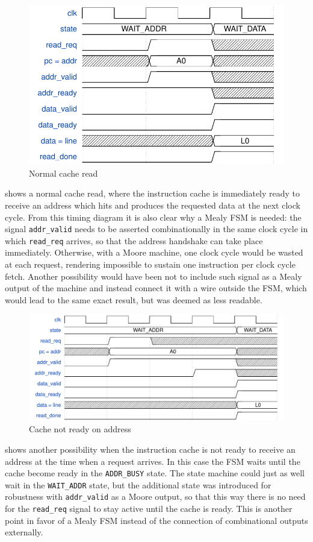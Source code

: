 \begin{figure}[hbt]
  \centering
  \includegraphics{img/cache01.pdf}
  \caption{Normal cache read}
  \label{fig:cache01}
\end{figure}
 shows a normal cache read, where the instruction cache is immediately ready to receive an address which hits and produces the requested data at the next clock cycle. From this timing diagram it is also clear why a Mealy \acs{FSM} is needed: the signal \texttt{addr\_valid} needs to be asserted combinationally in the same clock cycle in which \texttt{read\_req} arrives, so that the address handshake can take place immediately. Otherwise, with a Moore machine, one clock cycle would be wasted at each request, rendering impossible to sustain one instruction per clock cycle fetch. Another possibility would have been not to include such signal as a Mealy output of the machine and instead connect it with a wire outside the \acs{FSM}, which would lead to the same exact result, but was deemed as less readable.

\begin{figure}[hbt]
  \centering
  \includegraphics[width=\textwidth]{img/cache02.pdf}
  \caption{Cache not ready on address}
  \label{fig:cache02}
\end{figure}
 shows another possibility when the instruction cache is not ready to receive an address at the time when a request arrives. In this case the \acs{FSM} waits until the cache become ready in the \texttt{ADDR\_BUSY} state. The state machine could just as well wait in the \texttt{WAIT\_ADDR} state, but the additional state was introduced for robustness with \texttt{addr\_valid} as a Moore output, so that this way there is no need for the \texttt{read\_req} signal to stay active until the cache is ready. This is another point in favor of a Mealy \acs{FSM} instead of the connection of combinational outputs externally.

